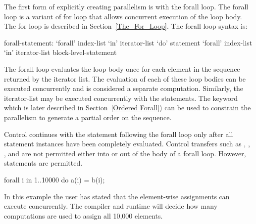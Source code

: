 The first form of explicitly creating parallelism is with the forall
loop. The forall loop is a variant of for loop that allows concurrent
execution of the loop body. The for loop is described in
Section~\ref{The_For_Loop}. The forall loop syntax is:
\begin{syntax}
forall-statement:
   `forall' index-list `in' iterator-list `do' statement
   `forall' index-list `in' iterator-list block-level-statement
\end{syntax}

The forall loop evaluates the loop body once for each element in the
sequence returned by the iterator list. The evaluation of each of
these loop bodies can be executed concurrently and is considered a
separate computation. Similarly, the iterator-list may be executed
concurrently with the statements. The keyword  which is
later described in Section~\ref{Ordered Forall}) can be used to constrain
the parallelism to generate a partial order on the sequence.

Control continues with the statement following the forall loop only
after all statement instances have been completely evaluated.
Control transfers such as , , ,
and  are not permitted either into or out of the body of
a forall loop.  However,  statements are permitted.

\begin{example}
\begin{chapel}
forall i in 1..10000 do
  a(i) = b(i);
\end{chapel}
In this example the user has stated that the element-wise assignments can
execute concurrently. The compiler and runtime will decide how many
computations are used to assign all 10,000 elements.
\end{example}
